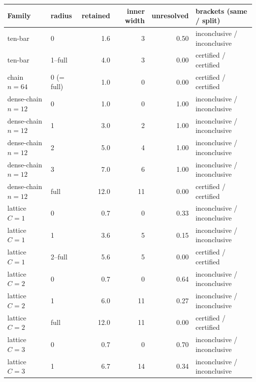 \documentclass[11pt]{article}
\theoremstyle{plain}
\theoremstyle{definition}
\theoremstyle{remark}
\begin{document}
\begin{center}
\begin{tabular}{@{}llrrrl@{}}
\toprule
Family & radius & retained & inner width & unresolved & brackets (same / split)\\
\midrule
ten-bar & 0 & 1.6 & 3 & 0.50 & inconclusive / inconclusive\\
ten-bar & 1--full & 4.0 & 3 & 0.00 & certified / certified\\
chain \(n{=}64\) & 0 (= full) & 1.0 & 0 & 0.00 & certified / certified\\
dense-chain \(n{=}12\) & 0 & 1.0 & 0 & 1.00 & inconclusive / inconclusive\\
dense-chain \(n{=}12\) & 1 & 3.0 & 2 & 1.00 & inconclusive / inconclusive\\
dense-chain \(n{=}12\) & 2 & 5.0 & 4 & 1.00 & inconclusive / inconclusive\\
dense-chain \(n{=}12\) & 3 & 7.0 & 6 & 1.00 & inconclusive / inconclusive\\
dense-chain \(n{=}12\) & full & 12.0 & 11 & 0.00 & certified / certified\\
lattice \(C{=}1\) & 0 & 0.7 & 0 & 0.33 & inconclusive / inconclusive\\
lattice \(C{=}1\) & 1 & 3.6 & 5 & 0.15 & inconclusive / inconclusive\\
lattice \(C{=}1\) & 2--full & 5.6 & 5 & 0.00 & certified / certified\\
lattice \(C{=}2\) & 0 & 0.7 & 0 & 0.64 & inconclusive / inconclusive\\
lattice \(C{=}2\) & 1 & 6.0 & 11 & 0.27 & inconclusive / inconclusive\\
lattice \(C{=}2\) & full & 12.0 & 11 & 0.00 & certified / certified\\
lattice \(C{=}3\) & 0 & 0.7 & 0 & 0.70 & inconclusive / inconclusive\\
lattice \(C{=}3\) & 1 & 6.7 & 14 & 0.34 & inconclusive / inconclusive\\
\bottomrule
\end{tabular}
\label{tab:sparsification-study}
\end{center}
\end{document}
